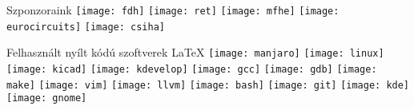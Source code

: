 \begin{frame}{Szponzoraink}
\texttt{[image: fdh]}
\texttt{[image: ret]}
\texttt{[image: mfhe]}
\texttt{[image: eurocircuits]}
\texttt{[image: csiha]}
\end{frame}

\begin{frame}{Felhasznált nyílt kódú szoftverek}
	\LaTeX
	\texttt{[image: manjaro]}
	\texttt{[image: linux]}
	\texttt{[image: kicad]}
	\texttt{[image: kdevelop]}
	\texttt{[image: gcc]}
	\texttt{[image: gdb]}
	\texttt{[image: make]}
	\texttt{[image: vim]}
	\texttt{[image: llvm]}
	\texttt{[image: bash]}
	\texttt{[image: git]}
	\texttt{[image: kde]}
	\texttt{[image: gnome]}
\end{frame}
